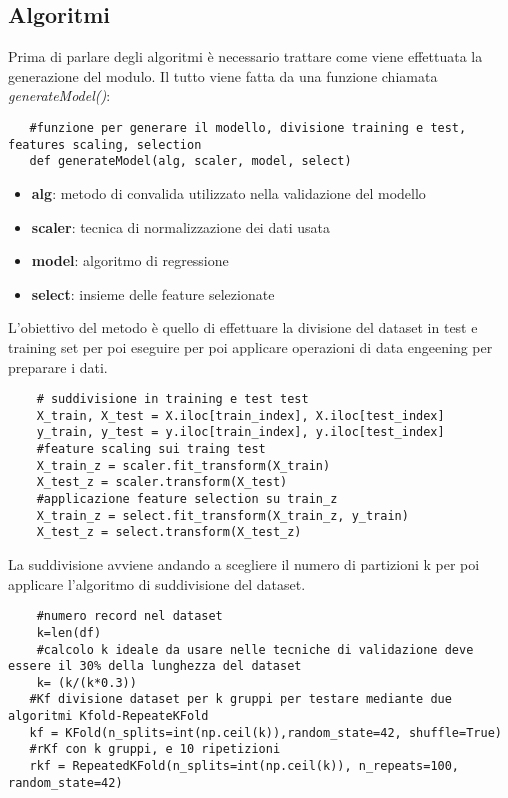 \subsection{Algoritmi}
\fancyhead{}    %
\label{paragrafo 4.3}

Prima di parlare degli algoritmi è necessario trattare come viene effettuata la generazione del modulo.
Il tutto viene fatta da una funzione chiamata \textit{generateModel()}:\\

\begin{lstlisting}
   #funzione per generare il modello, divisione training e test, features scaling, selection
   def generateModel(alg, scaler, model, select)
\end{lstlisting}



\par{
\begin{itemize}
    \item \textbf{alg}: metodo di convalida utilizzato nella validazione del modello
    \item \textbf{scaler}: tecnica di normalizzazione dei dati usata
    \item \textbf{model}: algoritmo di regressione
    \item \textbf{select}: insieme delle feature selezionate 
\end{itemize}
}

L'obiettivo del metodo è quello di effettuare la divisione del dataset in test e training set per poi eseguire per poi applicare operazioni di data engeening per preparare i dati. \\
\begin{lstlisting}
    # suddivisione in training e test test
    X_train, X_test = X.iloc[train_index], X.iloc[test_index]
    y_train, y_test = y.iloc[train_index], y.iloc[test_index]
    #feature scaling sui traing test
    X_train_z = scaler.fit_transform(X_train)
    X_test_z = scaler.transform(X_test)
    #applicazione feature selection su train_z
    X_train_z = select.fit_transform(X_train_z, y_train)
    X_test_z = select.transform(X_test_z)
\end{lstlisting}
La suddivisione avviene andando a scegliere il numero di partizioni k per poi applicare l'algoritmo di suddivisione del dataset.\\
\begin{lstlisting}
    #numero record nel dataset
    k=len(df)
    #calcolo k ideale da usare nelle tecniche di validazione deve essere il 30% della lunghezza del dataset
    k= (k/(k*0.3))
   #Kf divisione dataset per k gruppi per testare mediante due algoritmi Kfold-RepeateKFold
   kf = KFold(n_splits=int(np.ceil(k)),random_state=42, shuffle=True)
   #rKf con k gruppi, e 10 ripetizioni
   rkf = RepeatedKFold(n_splits=int(np.ceil(k)), n_repeats=100, random_state=42)
\end{lstlisting}

